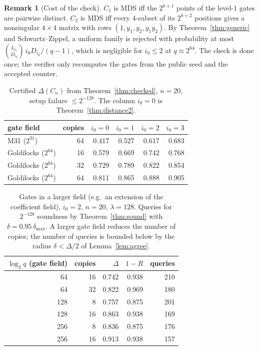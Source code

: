 \documentclass[11pt]{article}
\theoremstyle{definition}
\newtheorem{remark}[theorem]{Remark}
\begin{document}
\begin{remark}[Cost of the check]
$C_1$ is MDS iff the $2^{k+1}$ points of the level-$1$ gates are pairwise distinct. $C_2$ is MDS iff
every $4$-subset of its $2^{k+2}$ positions gives a nonsingular $4\times4$ matrix with rows
$(1,y_1,y_2,y_1y_2)$. By Theorem~\ref{thm:generic} and Schwartz--Zippel, a uniform family is
rejected with probability at most $\binom{L_{i_0}}{D_{i_0}}\,i_0D_{i_0}/(q-1)$, which is negligible for
$i_0\le2$ at $q\approx2^{64}$. The check is done once; the verifier only recomputes the gates from
the public seed and the accepted counter.
\end{remark}

\begin{table}[h]
\centering
\begin{tabular}{lrrrrr}
\toprule
gate field & copies & $i_0=0$ & $i_0=1$ & $i_0=2$ & $i_0=3$\\
\midrule
M31 ($2^{31}$) & 64 & 0.417 & 0.527 & 0.617 & 0.683\\
Goldilocks ($2^{64}$) & 16 & 0.579 & 0.669 & 0.742 & 0.768\\
Goldilocks ($2^{64}$) & 32 & 0.729 & 0.789 & 0.822 & 0.854\\
Goldilocks ($2^{64}$) & 64 & 0.811 & 0.865 & 0.888 & 0.905\\
\bottomrule
\end{tabular}
\caption{Certified $\Delta(C_n)$ from Theorem~\ref{thm:checked}, $n=20$, setup failure $\le2^{-128}$.
The column $i_0=0$ is Theorem~\ref{thm:distance2}.}
\label{tab:checked}
\end{table}

\begin{table}[h]
\centering
\begin{tabular}{rrrrr}
\toprule
$\log_2 q$ (gate field) & copies & $\Delta$ & $1-R$ & queries\\
\midrule
64 & 16 & 0.742 & 0.938 & 210\\
64 & 32 & 0.822 & 0.969 & 180\\
128 & 8 & 0.757 & 0.875 & 201\\
128 & 16 & 0.863 & 0.938 & 169\\
256 & 8 & 0.836 & 0.875 & 176\\
256 & 16 & 0.913 & 0.938 & 157\\
\bottomrule
\end{tabular}
\caption{Gates in a larger field (e.g.\ an extension of the coefficient field), $i_0=2$, $n=20$,
$\lambda=128$. Queries for $2^{-128}$ soundness by Theorem~\ref{thm:sound} with
$\delta=0.95\,\delta_{\max}$. A larger gate field reduces the number of copies; the number of queries
is bounded below by the radius $\delta<\Delta/2$ of Lemma~\ref{lem:agree}.}
\label{tab:extgates}
\end{table}
\end{document}
